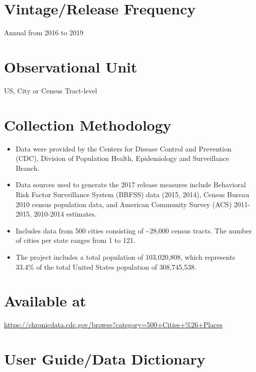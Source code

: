 \documentclass[
]{book}
\providecommand{\tightlist}{%
  \setlength{\itemsep}{0pt}\setlength{\parskip}{0pt}}
\begin{document}
\hypertarget{vintagerelease-frequency}{%
\section{Vintage/Release Frequency}\label{vintagerelease-frequency}}

Annual from 2016 to 2019

\hypertarget{observational-unit}{%
\section{Observational Unit}\label{observational-unit}}

US, City or Census Tract-level

\hypertarget{collection-methodology}{%
\section{Collection Methodology}\label{collection-methodology}}

\begin{itemize}
\tightlist
\item
  Data were provided by the Centers for Disease Control and Prevention (CDC), Division of Population Health, Epidemiology and Surveillance Branch.
\item
  Data sources used to generate the 2017 release measures include Behavioral Risk Factor Surveillance System (BRFSS) data (2015, 2014), Census Bureau 2010 census population data, and American Community Survey (ACS) 2011-2015, 2010-2014 estimates.
\item
  Includes data from 500 cities consisting of \textasciitilde28,000 census tracts. The number of cities per state ranges from 1 to 121.
\item
  The project includes a total population of 103,020,808, which represents 33.4\% of the total United States population of 308,745,538.
\end{itemize}

\hypertarget{available-at}{%
\section{Available at}\label{available-at}}

\url{https://chronicdata.cdc.gov/browse?category=500+Cities+\%26+Places}

\hypertarget{user-guidedata-dictionary}{%
\section{User Guide/Data Dictionary}\label{user-guidedata-dictionary}}
\end{document}
